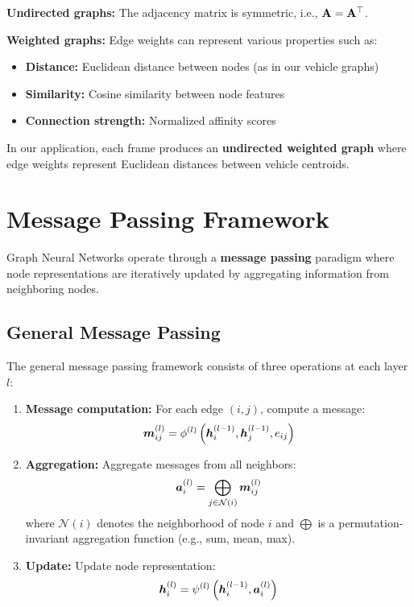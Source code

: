 \textbf{Undirected graphs:} The adjacency matrix is symmetric, i.e., $\mathbf{A} = \mathbf{A}^\top$.

\textbf{Weighted graphs:} Edge weights can represent various properties such as:
\begin{itemize}
    \item \textbf{Distance:} Euclidean distance between nodes (as in our vehicle graphs)
    \item \textbf{Similarity:} Cosine similarity between node features
    \item \textbf{Connection strength:} Normalized affinity scores
\end{itemize}

In our application, each frame produces an \textbf{undirected weighted graph} where edge weights represent Euclidean distances between vehicle centroids.

\section{Message Passing Framework}

Graph Neural Networks operate through a \textbf{message passing} paradigm where node representations are iteratively updated by aggregating information from neighboring nodes.

\subsection{General Message Passing}

The general message passing framework consists of three operations at each layer $l$:

\begin{enumerate}
    \item \textbf{Message computation:} For each edge $(i, j)$, compute a message:
    \begin{equation}
        \bm{m}_{ij}^{(l)} = \phi^{(l)}\left(\bm{h}_i^{(l-1)}, \bm{h}_j^{(l-1)}, e_{ij}\right)
    \end{equation}
    
    \item \textbf{Aggregation:} Aggregate messages from all neighbors:
    \begin{equation}
        \bm{a}_i^{(l)} = \bigoplus_{j \in \mathcal{N}(i)} \bm{m}_{ij}^{(l)}
    \end{equation}
    where $\mathcal{N}(i)$ denotes the neighborhood of node $i$ and $\bigoplus$ is a permutation-invariant aggregation function (e.g., sum, mean, max).
    
    \item \textbf{Update:} Update node representation:
    \begin{equation}
        \bm{h}_i^{(l)} = \psi^{(l)}\left(\bm{h}_i^{(l-1)}, \bm{a}_i^{(l)}\right)
    \end{equation}
\end{enumerate}

